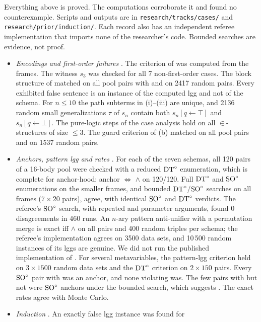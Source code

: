 Everything above is proved. The computations corroborate it and found no counterexample. Scripts and outputs are in
\texttt{research/tracks/cases/} and \texttt{research/prior/induction/}. Each record also has an independent referee
implementation that imports none of the researcher's code. Bounded searches are evidence, not proof.
\begin{itemize}
\item \emph{Encodings and first-order failures} . The criterion of
   was computed from the frames. The witness $s_3$ was checked for all 7 non-first-order cases.
  The block structure of  matched on all pool pairs with \evR{} and on 2417 random pairs. Every
  exhibited false sentence is an instance of the computed lgg and not of the schema. For $n\le10$ the path subterms in
  (i)--(iii) are unique, and 2136 random small generalizations $\tau$ of $s_n$ contain both
  $s_n[q\leftarrow\top]$ and $s_n[q\leftarrow\bot]$. The pure-logic steps of the case analysis hold on all
  $\in$-structures of size $\le3$. The guard criterion of (b) matched on all pool pairs and on 1537
  random pairs.
\item \emph{Anchors, pattern lgg and rates} . For each of the seven schemas,
  all 120 pairs of a 16-body pool were checked with a reduced $\mathrm{DT}^{\circ}$ enumeration, which is complete for anchor-hood:
  anchor $\iff$ \evR{}$\wedge$\zfN{} on 120/120. Full $\mathrm{DT}^{\circ}$ and $\mathrm{SO}^{\circ}$ enumerations on the smaller frames, and bounded
  $\mathrm{DT}^{\circ}$/$\mathrm{SO}^{\circ}$ searches on all frames ($7\times20$ pairs), agree, with identical $\mathrm{SO}^{\circ}$ and $\mathrm{DT}^{\circ}$ verdicts. The referee's
  $\mathrm{SO}^{\circ}$ search, with repeated and parameter arguments, found 0 disagreements in 460 runs. An $n$-ary pattern
  anti-unifier with a permutation merge is exact iff \evR{}$\wedge$\zfN{} on all pairs and 400 random triples per
  schema; the referee's implementation agrees on 3500 data sets, and 10\,500 random instances of its lggs are genuine.
  We did not run the published implementation of \citet{baumgartner2017higher}. For several metavariables, the
  pattern-lgg criterion held on $3\times1500$ random data sets and the $\mathrm{DT}^{\circ}$ criterion on $2\times150$ pairs. Every
  $\mathrm{SO}^{\circ}$ pair with \zfDroot{} was an anchor, and none violating \zfDdt{} was. The few pairs with \zfDdt{} but not
  \zfDroot{} were $\mathrm{SO}^{\circ}$ anchors under the bounded search, which suggests . The
  exact rates agree with Monte Carlo.
\item \emph{Induction} . An exactly false lgg instance was found for

\end{itemize}
